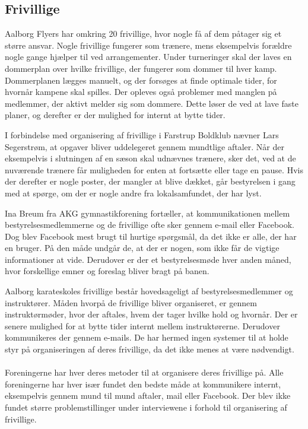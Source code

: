 \subsection*{Frivillige}
Aalborg Flyers har omkring 20 frivillige, hvor nogle få af dem påtager sig et større ansvar. Nogle frivillige fungerer som trænere, mens eksempelvis forældre nogle gange hjælper til ved arrangementer. Under turneringer skal der laves en dommerplan over hvilke frivillige, der fungerer som dommer til hver kamp. Dommerplanen lægges manuelt, og der forsøges at finde optimale tider, for hvornår kampene skal spilles. Der opleves også problemer med manglen på medlemmer, der aktivt melder sig som dommere. Dette løser de ved at lave faste planer, og derefter er der mulighed for internt at bytte tider.
\par
I forbindelse med organisering af frivillige i Farstrup Boldklub nævner Lars Segerstrøm, at opgaver bliver uddelegeret gennem mundtlige aftaler. Når der eksempelvis i slutningen af en sæson skal udnævnes trænere, sker det, ved at de nuværende trænere får muligheden for enten at fortsætte eller tage en pause. Hvis der derefter er nogle poster, der mangler at blive dækket, går bestyrelsen i gang med at spørge, om der er nogle andre fra lokalsamfundet, der har lyst.
\par
Ina Breum fra AKG gymnastikforening fortæller, at kommunikationen mellem bestyrelsesmedlemmerne og de frivillige ofte sker gennem e-mail eller Facebook. Dog blev Facebook mest brugt til hurtige spørgsmål, da det ikke er alle, der har en bruger. På den måde undgår de, at der er nogen, som ikke får de vigtige informationer at vide. Derudover er der et bestyrelsesmøde hver anden måned, hvor forskellige emner og foreslag bliver bragt på banen.
\par %
Aalborg karateskoles frivillige består hovedsageligt af bestyrelsesmedlemmer og instruktører. Måden hvorpå de frivillige bliver organiseret, er gennem instruktørmøder, hvor der aftales, hvem der tager hvilke hold og hvornår. Der er senere mulighed for at bytte tider internt mellem instruktørerne. Derudover kommunikeres der gennem e-mails. De har hermed ingen systemer til at holde styr på organiseringen af deres frivillige, da det ikke menes at være nødvendigt.
\\\\
Foreningerne har hver deres metoder til at organisere deres frivillige på. Alle foreningerne har hver især fundet den bedste måde at kommunikere internt, eksempelvis gennem mund til mund aftaler, mail eller Facebook. Der blev ikke fundet større problemstillinger under interviewene i forhold til organisering af frivillige.

